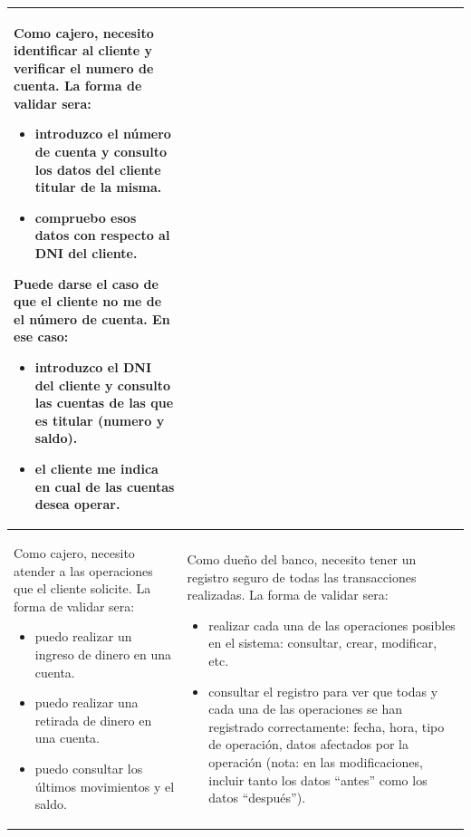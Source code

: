 \documentclass[spanish,12pt,a4paper,final,oneside]{book}
\begin{document}
\begin{longtable}{|p{7cm}|p{7cm}|}
Como cajero, necesito identificar al cliente y verificar el numero de cuenta. 
\newline \newline
La forma de validar sera:
\begin{itemize}
\item introduzco el número de cuenta y consulto los datos del cliente titular de la misma.
\item compruebo esos datos con respecto al DNI del cliente.
\end{itemize}
Puede darse el caso de que el cliente no me de el número de cuenta. En ese caso:
\begin{itemize}
\item introduzco el DNI del cliente y consulto las cuentas de las que es titular (numero y saldo).
\item el cliente me indica en cual de las cuentas desea operar.
\end{itemize}

\\ \hline
                        
Como cajero, necesito atender a las operaciones que el cliente solicite.
\newline \newline
La forma de validar sera:
\begin{itemize}
\item puedo realizar un ingreso de dinero en una cuenta.
\item puedo realizar una retirada de dinero en una cuenta.
\item puedo consultar los últimos movimientos y el saldo.
\end{itemize}

&                        
                
Como dueño del banco, necesito tener un registro seguro de todas las transacciones realizadas.
\newline \newline
 La forma de validar sera:                
\begin{itemize}
\item realizar cada una de las operaciones posibles en el sistema: consultar, crear, modificar, etc.
\item consultar el registro para ver que todas y cada una de las operaciones se han registrado correctamente: fecha, hora, tipo de operación, datos afectados por la operación (nota: en las modificaciones, incluir tanto los datos ``antes'' como los datos ``después'').
\end{itemize}
                        
\\ \hline
                

\end{longtable}
\end{document}
